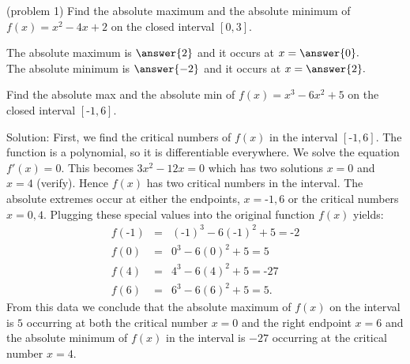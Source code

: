 \documentclass[handout]{ximera}
\begin{document}
\begin{problem}(problem 1)
Find the absolute maximum and the absolute minimum of $f(x) = x^2 - 4x + 2$
on the closed interval $[0, 3]$.

The absolute maximum is $\answer{2}$ and it occurs at $x = \answer{0}.$\\
The absolute minimum is $\answer{-2}$ and it occurs at $x = \answer{2}.$ 

\end{problem}



\begin{example}[example 2]
 Find the absolute max and the absolute min of $f(x) = x^3 - 6x^2 + 5$ on the closed interval $[\text{-}1, 6]$.

Solution:  First, we find the critical numbers of $f(x)$ in the interval $[\text{-}1, 6]$. 
The function is a polynomial, so it is differentiable everywhere.  
We solve the equation $f'(x) =0$.  This becomes $3x^2 -12x= 0$ which has two solutions $x=0$ and $x = 4$ (verify).
Hence $f(x)$ has two critical numbers in the interval.
The absolute extremes occur at either the endpoints, $x=\text{-}1, 6$ or the critical numbers $x = 0, 4$.  
Plugging these special values into the original function $f(x)$ yields:
\begin{eqnarray*}
f(\text{-}1) &=& (\text{-}1)^3 -6(\text{-}1)^2 + 5 = \text{-}2\\
f(0) &=& 0^3 - 6(0)^2 + 5 =5\\
f(4) &=& 4^3 - 6(4)^2 + 5 = \text{-}27\\
f(6) &=& 6^3 - 6(6)^2 + 5 = 5.
\end{eqnarray*}
From this data we conclude that the absolute maximum of $f(x)$ on the interval is $5$ occurring 
at both the critical number $x = 0$ and the right endpoint $x = 6$ and 
the absolute minimum of $f(x)$ in the interval is $-27$
occurring at the critical number $x = 4$.
\begin{image}
\end{image}
\end{example}
\end{document}
